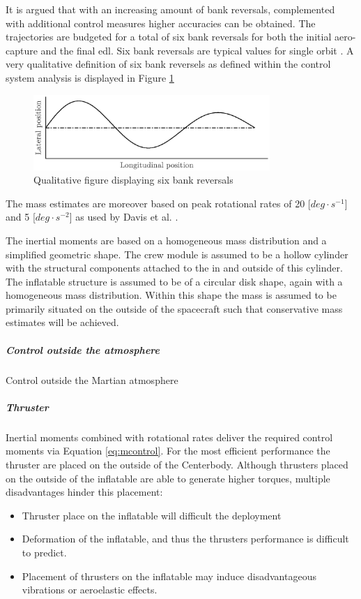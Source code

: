 It is argued that with an increasing amount of bank reversals, complemented with additional control measures higher accuracies can be obtained. The trajectories are budgeted for a total of six bank reversals for both the initial aero-capture and the final \gls{edl}. Six bank reversals are typical values for single orbit \cite{Lu2007, Cianciolo2010}. A very qualitative definition of six bank reversels as defined within the control system analysis is displayed in Figure \ref{fig:bankdef}

\begin{figure}[h]
	\centering
	\includegraphics[width=0.8\textwidth]{./Figure/control/bankdef.eps}
	\caption{Qualitative figure displaying six bank reversals}
	\label{fig:bankdef}
\end{figure}


The mass estimates are moreover based on peak rotational rates of 20 [$deg\cdot s^{-1}$] and 5 [$deg \cdot s^{-2}$] as used by Davis et al. \cite{Davis2010}.

The inertial moments are based on a homogeneous mass distribution and a simplified geometric shape. The crew module is assumed to be a hollow cylinder with the structural components attached to the in and outside of this cylinder. The inflatable structure is assumed to be of a circular disk shape, again with a homogeneous mass distribution. Within this shape the mass is assumed to be primarily situated on the outside of the spacecraft such that conservative mass estimates will be achieved.


\subparagraph{Control outside the atmosphere}

Control outside the Martian atmosphere 


\subparagraph{Thruster}

Inertial moments combined with rotational rates deliver the required control moments via Equation \ref{eq:mcontrol}. For the most efficient performance the thruster are placed on the outside of the Centerbody. Although thrusters placed on the outside of the inflatable are able to generate higher torques, multiple disadvantages hinder this placement:

\begin{itemize}
\item Thruster place on the inflatable will difficult the deployment
\item Deformation of the inflatable, and thus the thrusters performance is difficult to predict.
\item Placement of thrusters on the inflatable may induce disadvantageous vibrations or aeroelastic effects.  
\end{itemize} 

